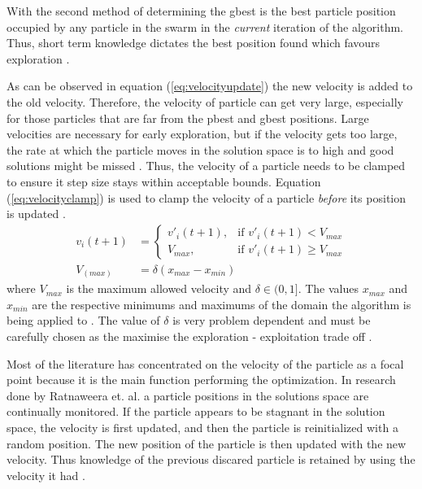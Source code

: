 With the second method of determining the gbest is the best particle position occupied by any particle in the swarm in the \emph{current} iteration of the algorithm. Thus, short term knowledge dictates the best position found which favours exploration \cite{CompuIntelligenceIntro,FundamentalSwarm}.

As can be observed in equation (\ref{eq:velocityupdate}) the new velocity is added to the old velocity. Therefore, the velocity of particle can get very large, especially for those particles that are far from the pbest and gbest positions. Large velocities are necessary for early exploration, but if the velocity gets too large, the rate at which the particle moves in the solution space is to high and good solutions might be missed \cite{FundamentalSwarm}. Thus, the velocity of a particle needs to be clamped to ensure it step size stays within acceptable bounds. Equation (\ref{eq:velocityclamp}) is used to clamp the velocity of a particle \emph{before} its position is updated \cite{FundamentalSwarm}.
\begin{align}
	v_i(t+1) &=
	\begin{cases}
	v'_i(t+1), &\text{if $v'_i(t+1) < V_{max}$}\\
	V_{max}, &\text{if $v'_i(t+1) \geq V_{max}$}
	\end{cases} \label{eq:velocityclamp}\\
	V_(max) &= \delta(x_{max} - x_{min})
\end{align}
where $V_{max}$ is the maximum allowed velocity and $\delta \in (0,1]$. The values $x_{max}$ and $x_{min}$ are the respective minimums and maximums of the domain the algorithm is being applied to \cite{FundamentalSwarm}. The value of $\delta$ is very problem dependent and must be carefully chosen as the maximise the exploration - exploitation trade off \cite{FundamentalSwarm}. 

Most of the literature has concentrated on the velocity of the particle as a focal point because it is the main function performing the optimization. In research done by Ratnaweera et. al.\cite{PSOSelfHierarch} a particle positions in the solutions space are continually monitored. If the particle appears to be stagnant in the solution space, the velocity is first updated, and then the particle is reinitialized with a random position. The new position of the particle is then updated with the new velocity. Thus knowledge of the previous discared particle is retained by using the velocity it had \cite{PSOSelfHierarch}.

